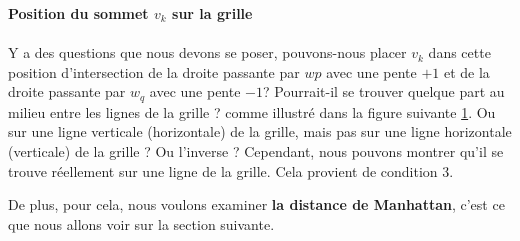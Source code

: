 \documentclass[hidelinks,letterpaper,12pt]{article}
\begin{document}
\textbf{Position du sommet $v_k$ sur la grille}
\\ \\
Y a des questions que nous devons se poser, pouvons-nous placer $v_k$ dans cette position d'intersection de la droite passante par $wp$ avec une pente $+1$ et de la droite passante par $w_q$ avec une pente $-1$? Pourrait-il se trouver quelque part au milieu entre les lignes de la grille ? comme illustré dans la figure suivante \ref{Exploration d'une possible position du sommet $v_k$ sur la grille (à vérifier)}. Ou sur une ligne verticale (horizontale) de la grille, mais pas sur une ligne horizontale (verticale) de la grille ? Ou l'inverse ? Cependant, nous pouvons montrer qu'il se trouve réellement sur une ligne de la grille. Cela provient de condition 3. 
\begin{figure}[H]
\centering
{} 
\label{Exploration d'une possible position du sommet $v_k$ sur la grille (à vérifier)}
\end{figure}
De plus, pour cela, nous voulons examiner \textbf{la distance de Manhattan}, c'est ce que nous allons voir sur la section suivante.
\end{document}
